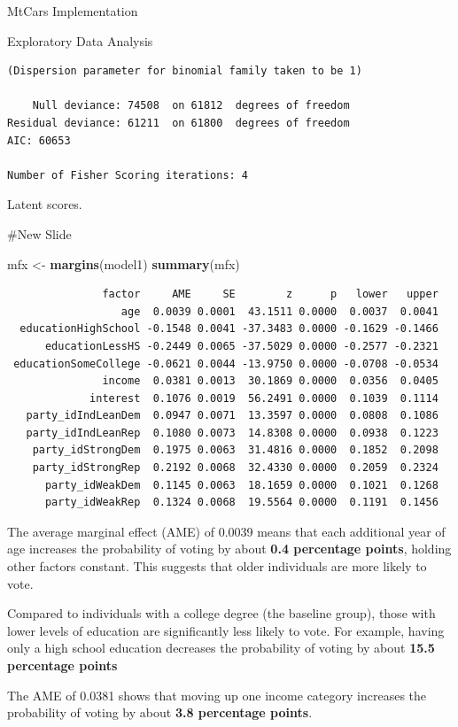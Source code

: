 \documentclass[
  ignorenonframetext,
]{beamer}
\newenvironment{Shaded}{\begin{snugshade}}{\end{snugshade}}
\newcommand{\FunctionTok}[1]{\textcolor[rgb]{0.13,0.29,0.53}{\textbf{#1}}}
\newcommand{\NormalTok}[1]{#1}
\newcommand{\OtherTok}[1]{\textcolor[rgb]{0.56,0.35,0.01}{#1}}
\begin{document}
\begin{frame}[fragile]{MtCars Implementation}
\begin{block}{Exploratory Data Analysis}
\begin{verbatim}
(Dispersion parameter for binomial family taken to be 1)

    Null deviance: 74508  on 61812  degrees of freedom
Residual deviance: 61211  on 61800  degrees of freedom
AIC: 60653

Number of Fisher Scoring iterations: 4
\end{verbatim}

Latent scores.

\#New Slide

\begin{Shaded}
\begin{Highlighting}[]
\NormalTok{mfx }\OtherTok{\textless{}{-}} \FunctionTok{margins}\NormalTok{(model1)}
\FunctionTok{summary}\NormalTok{(mfx)}
\end{Highlighting}
\end{Shaded}

\begin{verbatim}
               factor     AME     SE        z      p   lower   upper
                  age  0.0039 0.0001  43.1511 0.0000  0.0037  0.0041
  educationHighSchool -0.1548 0.0041 -37.3483 0.0000 -0.1629 -0.1466
      educationLessHS -0.2449 0.0065 -37.5029 0.0000 -0.2577 -0.2321
 educationSomeCollege -0.0621 0.0044 -13.9750 0.0000 -0.0708 -0.0534
               income  0.0381 0.0013  30.1869 0.0000  0.0356  0.0405
             interest  0.1076 0.0019  56.2491 0.0000  0.1039  0.1114
   party_idIndLeanDem  0.0947 0.0071  13.3597 0.0000  0.0808  0.1086
   party_idIndLeanRep  0.1080 0.0073  14.8308 0.0000  0.0938  0.1223
    party_idStrongDem  0.1975 0.0063  31.4816 0.0000  0.1852  0.2098
    party_idStrongRep  0.2192 0.0068  32.4330 0.0000  0.2059  0.2324
      party_idWeakDem  0.1145 0.0063  18.1659 0.0000  0.1021  0.1268
      party_idWeakRep  0.1324 0.0068  19.5564 0.0000  0.1191  0.1456
\end{verbatim}

The average marginal effect (AME) of 0.0039 means that each additional
year of age increases the probability of voting by about \textbf{0.4
percentage points}, holding other factors constant. This suggests that
older individuals are more likely to vote.

Compared to individuals with a college degree (the baseline group),
those with lower levels of education are significantly less likely to
vote. For example, having only a high school education decreases the
probability of voting by about \textbf{15.5 percentage points}

The AME of 0.0381 shows that moving up one income category increases the
probability of voting by about \textbf{3.8 percentage points}.


\end{block}
\end{frame}
\end{document}
